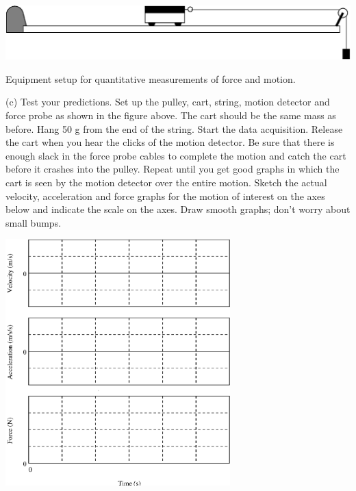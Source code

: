 \newpage

\begin{center}
\includegraphics{force1/force1_fig4.eps}

{Equipment setup for quantitative measurements of force and motion.}
\end{center}

(c) Test your predictions. Set up the pulley, cart, string, motion detector
and force probe as shown in the figure above. The cart should be the same mass as before. Hang 50 g from the end of the string. Start the data acquisition.
Release the cart when you hear the clicks of the motion detector. Be sure that
there is enough slack in the force probe cables to complete the motion and catch
the cart before it crashes into the pulley. Repeat until you get good graphs
in which the cart is seen by the motion detector over the entire motion. Sketch
the actual velocity, acceleration and force graphs for the motion of interest
on the axes below and indicate the scale on the axes. Draw smooth graphs; don't
worry about small bumps.

\vspace{0.3cm}
{\par\centering \includegraphics[width=0.65\textwidth]{force1/force1_fig5.eps} \par}
\vspace{0.3cm}

